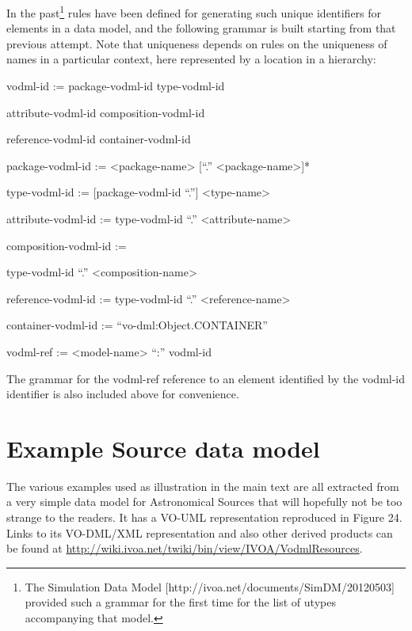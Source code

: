 \documentclass[10pt,a4paper]{ivoa}
\begin{document}
In the past\footnote{The Simulation Data Model
  {[}http://ivoa.net/documents/SimDM/20120503{]} provided such a grammar
  for the first time for the list of utypes accompanying that model.}
rules have been defined for generating such unique identifiers for
elements in a data model, and the following grammar is built starting
from that previous attempt. Note that uniqueness depends on rules on the
uniqueness of names in a particular context, here represented by a
location in a hierarchy:

vodml-id := package-vodml-id \textbar{} type-vodml-id \textbar{}

attribute-vodml-id \textbar{} composition-vodml-id \textbar{}

reference-vodml-id \textbar{} container-vodml-id

package-vodml-id := \textless package-name\textgreater{} {[}``.''
\textless package-name\textgreater{]}*

type-vodml-id := {[}package-vodml-id ``.''{]}
\textless type-name\textgreater{}

attribute-vodml-id := type-vodml-id ``.''
\textless attribute-name\textgreater{}

composition-vodml-id :=

type-vodml-id ``.'' \textless composition-name\textgreater{}

reference-vodml-id := type-vodml-id ``.''
\textless reference-name\textgreater{}

container-vodml-id := ``vo-dml:Object.CONTAINER''

vodml-ref := \textless model-name\textgreater{} ``:'' vodml-id

The grammar for the vodml-ref reference to an element identified by the
vodml-id identifier is also included above for convenience.

\hypertarget{example-source-data-model}{%
\section{Example Source data model}\label{example-source-data-model}}

The various examples used as illustration in the main text are all
extracted from a very simple data model for Astronomical Sources that
will hopefully not be too strange to the readers. It has a VO-UML
representation reproduced in Figure 24. Links to its VO-DML/XML
representation and also other derived products can be found at
\url{http://wiki.ivoa.net/twiki/bin/view/IVOA/VodmlResources}.
\end{document}
